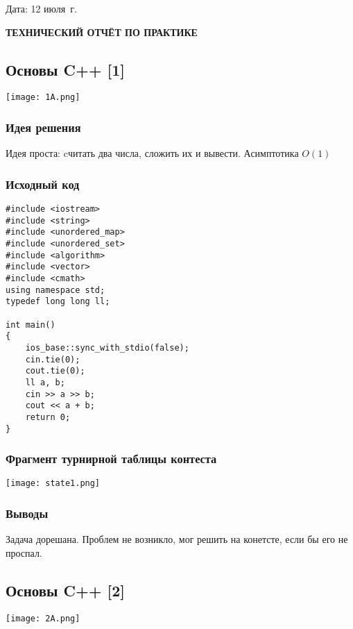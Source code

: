\documentclass[12pt]{article}
\begin{document}
\noindent
Дата: 12 июля \the\year\,г.\hspace{50pt}\textit
\pagebreak
\begin{center}
\bfseries{\large ТЕХНИЧЕСКИЙ ОТЧЁТ ПО ПРАКТИКЕ}
\end{center}

\subsection*{Основы C++ [1]}
\begin{center}
\texttt{[image: 1A.png]}
\end{center}
\subsubsection*{Идея решения}
Идея проста: cчитать два числа, сложить их и вывести. Асимптотика $O(1)$

\subsubsection*{Исходный код}
\begin{lstlisting}
#include <iostream>
#include <string>
#include <unordered_map>
#include <unordered_set>
#include <algorithm>
#include <vector>
#include <cmath>
using namespace std;
typedef long long ll;

int main()
{
	ios_base::sync_with_stdio(false);
	cin.tie(0);
	cout.tie(0);
	ll a, b;
	cin >> a >> b;
	cout << a + b;
	return 0;
}
\end{lstlisting}
\subsubsection*{Фрагмент турнирной таблицы контеста}
\begin{center}
\texttt{[image: state1.png]}\newline\noindent
\end{center}

\subsubsection*{Выводы}
Задача дорешана. Проблем не возникло, мог решить на конетсте, если бы его не проспал.
\subsection*{Основы C++ [2]}
\begin{center}
\texttt{[image: 2A.png]}
\end{center}
\end{document}
